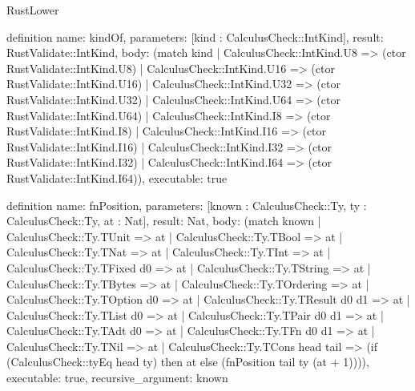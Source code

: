 \begin{lexlean}{RustLower}
\begin{semanticmodule}
definition{
  name: kindOf,
  parameters: [kind : CalculusCheck::IntKind],
  result: RustValidate::IntKind,
  body: (match kind
    | CalculusCheck::IntKind.U8 => (ctor RustValidate::IntKind.U8)
    | CalculusCheck::IntKind.U16 => (ctor RustValidate::IntKind.U16)
    | CalculusCheck::IntKind.U32 => (ctor RustValidate::IntKind.U32)
    | CalculusCheck::IntKind.U64 => (ctor RustValidate::IntKind.U64)
    | CalculusCheck::IntKind.I8 => (ctor RustValidate::IntKind.I8)
    | CalculusCheck::IntKind.I16 => (ctor RustValidate::IntKind.I16)
    | CalculusCheck::IntKind.I32 => (ctor RustValidate::IntKind.I32)
    | CalculusCheck::IntKind.I64 => (ctor RustValidate::IntKind.I64)),
  executable: true
}

definition{
  name: fnPosition,
  parameters: [known : CalculusCheck::Ty, ty : CalculusCheck::Ty, at : Nat],
  result: Nat,
  body: (match known
    | CalculusCheck::Ty.TUnit => at
    | CalculusCheck::Ty.TBool => at
    | CalculusCheck::Ty.TNat => at
    | CalculusCheck::Ty.TInt => at
    | CalculusCheck::Ty.TFixed d0 => at
    | CalculusCheck::Ty.TString => at
    | CalculusCheck::Ty.TBytes => at
    | CalculusCheck::Ty.TOrdering => at
    | CalculusCheck::Ty.TOption d0 => at
    | CalculusCheck::Ty.TResult d0 d1 => at
    | CalculusCheck::Ty.TList d0 => at
    | CalculusCheck::Ty.TPair d0 d1 => at
    | CalculusCheck::Ty.TAdt d0 => at
    | CalculusCheck::Ty.TFn d0 d1 => at
    | CalculusCheck::Ty.TNil => at
    | CalculusCheck::Ty.TCons head tail => (if (CalculusCheck::tyEq head ty) then at else (fnPosition tail ty (at + 1)))),
  executable: true,
  recursive_argument: known
}


\end{semanticmodule}
\end{lexlean}
